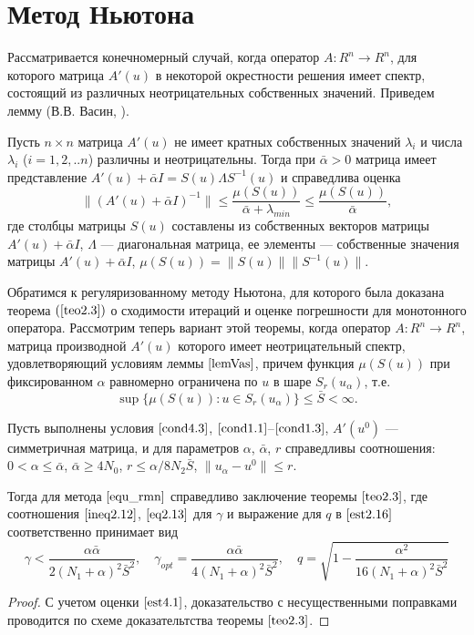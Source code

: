 \section{Метод Ньютона}
Рассматривается конечномерный случай, когда оператор $A\colon R^n \to R^n$, для которого матрица $A'(u)$ в некоторой окрестности решения имеет спектр, состоящий из различных неотрицательных собственных значений.
Приведем лемму (В.В. Васин, \cite{VasSkur2017}).
\begin{lemma}\label{lemVas}
	Пусть $n\times n$ матрица $A'(u)$ не имеет кратных собственных значений $\lambda _i$ и числа $\lambda _i$ ($i=1,2,..n$) различны и неотрицательны. Тогда при $\bar\alpha>0$ матрица имеет представление $A'(u)+\bar\alpha I =S(u)\Lambda S^{-1}(u)$ и справедлива оценка
	\begin{equation}\label{est4.1}
	\|(A'(u)+\bar\alpha I)^{-1}\|\le \frac{\mu (S(u))}{\bar\alpha+\lambda_{min}} \le \frac{\mu(S(u))}{\bar\alpha},
	\end{equation}
	где столбцы матрицы $S(u)$ составлены из собственных векторов матрицы $A'(u)+\bar\alpha I$, $\Lambda$ --- диагональная матрица, ее элементы --- собственные значения матрицы $A'(u)+\bar\alpha I$, $\mu(S(u))=\|S(u)\|\|S^{-1}(u)\|$.
\end{lemma}
Обратимся к регуляризованному методу Ньютона, для которого была доказана теорема $(\ref{teo2.3})$ о сходимости итераций и оценке погрешности для монотонного оператора. Рассмотрим теперь вариант этой теоремы, когда оператор $A\colon R^n \to R^n$, матрица производной $A'(u)$ которого имеет неотрицательный спектр, удовлетворяющий условиям леммы $\ref{lemVas}$, причем функция $\mu(S(u))$ при фиксированном $\alpha$ равномерно ограничена по $u$ в шаре $S_r(u_\alpha)$, т.е.
\begin{equation}\label{cond4.3}
\sup\{\mu(S(u)): u\in S_r(u_\alpha)\}\le\bar S <\infty .
\end{equation}
\begin{theorem}\label{teo4.1}
	Пусть выполнены условия $\eqref{cond4.3}$, $\eqref{cond1.1}$--$\eqref{cond1.3}$, $A'(u^0)$ --- симметричная матрица, и для параметров $\alpha$, $\bar{\alpha}$, $r$ справедливы соотношения: $0<\alpha\le\bar\alpha$, $\bar\alpha\ge 4N_0$, $r\le\alpha/8N_2\bar S$, $\|u_\alpha-u^0\|\le r$.
	
	Тогда для метода $\eqref{equ_rmn}$ справедливо заключение теоремы $\ref{teo2.3}$, где соотношения $\eqref{ineq2.12}$, $\eqref{eq2.13}$ для $\gamma$ и выражение для $q$ в $\eqref{est2.16}$ соответственно принимает вид
	$$\gamma < \frac{\alpha\bar\alpha}{2(N_1+\alpha)^2\bar S^2}, \quad \gamma _{opt}=\frac{\alpha\bar\alpha}{4(N_1+\alpha)^2\bar S^2}, \quad q=\sqrt{1-\frac{\alpha ^2}{16(N_1+\alpha)^2\bar S^2}}$$
\end{theorem}
\begin{proof} С учетом оценки $\eqref{est4.1}$, доказательство с несущественными поправками проводится по схеме доказательтства теоремы $\ref{teo2.3}$.
\end{proof}

